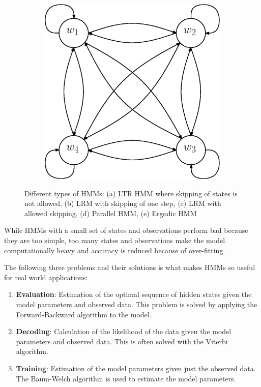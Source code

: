 \documentclass[a4paper, oneside]{csthesis}
\begin{document}
\begin{figure}
        \begin{subfigure}[b]{0.25\textwidth}
                \centering
                \includegraphics[width=\textwidth]{figures/hmm-ltr4.eps}
                \caption{}
                \label{fig:hmm1}
        \end{subfigure}%



        \caption{Different types of HMMs: (a) LTR HMM where skipping of states is not allowed, (b) LRM with skipping of one step, (c) LRM with allowed skipping, (d) Parallel HMM, (e) Ergodic HMM}\label{fig:markov-models}
\end{figure}



While HMMs with a small set of states and observations perform bad because they are too simple, too many states and observations make the model computationally heavy and accuracy is reduced because of over-fitting.

The following three problems and their solutions is what makes HMMs so useful for real world applications:
\begin{enumerate}
\item \textbf{Evaluation}: Estimation of the optimal sequence of hidden states given the model parameters and observed data. This problem is solved by applying the Forward-Backward algorithm to the model.
\item \textbf{Decoding}: Calculation of the likelihood of the data given the model parameters and observed data. This is often solved with the Viterbi algorithm.
\item \textbf{Training}: Estimation of the model parameters given just the observed data. The Baum-Welch algorithm is used to estimate the model parameters.
\end{enumerate}
\end{document}
